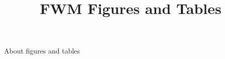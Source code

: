 \documentclass{article}
\begin{document}
\title{FWM Figures and Tables}

\maketitle


About figures and tables
\end{document}
